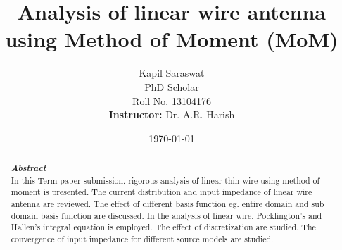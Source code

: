 \documentclass[aps,prstab,twocolumn,superscriptaddress,groupedaddress,showkeys,nofootinbib]{revtex4}  %
\begin{document}
\widetext


\title[Computational Electromagnetics (EE640) Term Paper]{Analysis of linear wire antenna using Method of Moment (MoM)}
\author{Kapil Saraswat\\PhD Scholar\\Roll No. 13104176\\ \textbf{Instructor:} Dr. A.R. Harish}
\date{\today}
\begin{abstract}

\textbf{\textit{Abstract}}\\
In this Term paper submission, rigorous analysis of linear thin wire using method of moment is presented. The current distribution and input impedance of linear wire antenna are reviewed. The effect of different basis function eg. entire domain and sub domain basis function are discussed. In the analysis of linear wire, Pocklington's and Hallen's integral equation is employed. The effect of discretization are studied. The convergence of input impedance for different source models are studied. 
\end{abstract}


\maketitle
\end{document}
